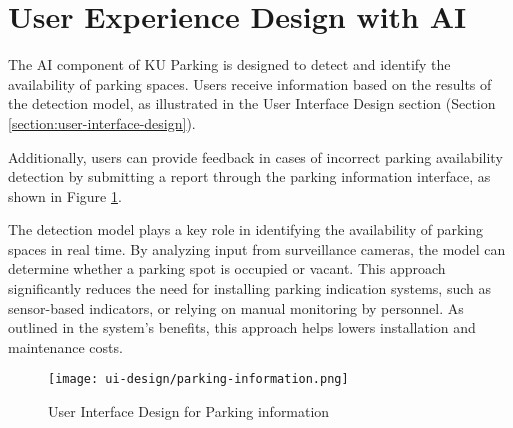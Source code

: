 \clearpage
\section{User Experience Design with AI}
\label{section:user-experience-with-ai}
The AI component of KU Parking is designed to detect and identify the availability of parking spaces. Users receive information based on the results of the detection model, as illustrated in the User Interface Design section (Section \ref{section:user-interface-design}).

Additionally, users can provide feedback in cases of incorrect parking availability detection by submitting a report through the parking information interface, as shown in Figure \ref{fig:ui_parking_information}.

The detection model plays a key role in identifying the availability of parking spaces in real time. By analyzing input from surveillance cameras, the model can determine whether a parking spot is occupied or vacant. This approach significantly reduces the need for installing parking indication systems, such as sensor-based indicators, or relying on manual monitoring by personnel. As outlined in the system's benefits, this approach helps lowers installation and maintenance costs.

\begin{figure}[h]
    \centering
    \texttt{[image: ui-design/parking-information.png]}
    \caption{User Interface Design for Parking information}
    \label{fig:ui_parking_information}
\end{figure}
